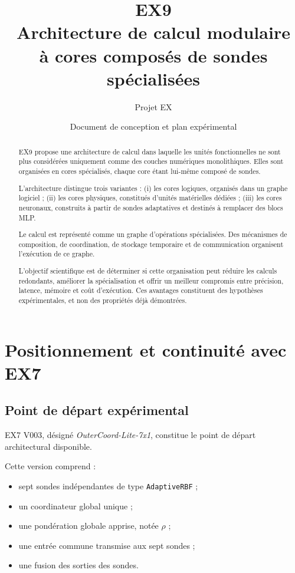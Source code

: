 \documentclass[11pt,a4paper]{article}
\title{
  \textbf{EX9}\\[0.3cm]
  \Large Architecture de calcul modulaire\\
  \Large à cores composés de sondes spécialisées
}
\author{Projet EX}
\date{Document de conception et plan expérimental}
\begin{document}
\maketitle

\begin{abstract}
EX9 propose une architecture de calcul dans laquelle les unités
fonctionnelles ne sont plus considérées uniquement comme des couches
numériques monolithiques. Elles sont organisées en cores spécialisés,
chaque core étant lui-même composé de sondes.

L'architecture distingue trois variantes :
(i) les cores logiques, organisés dans un graphe logiciel ;
(ii) les cores physiques, constitués d'unités matérielles dédiées ;
(iii) les cores neuronaux, construits à partir de sondes adaptatives
et destinés à remplacer des blocs MLP.

Le calcul est représenté comme un graphe d'opérations spécialisées.
Des mécanismes de composition, de coordination, de stockage temporaire
et de communication organisent l'exécution de ce graphe.

L'objectif scientifique est de déterminer si cette organisation peut
réduire les calculs redondants, améliorer la spécialisation et offrir
un meilleur compromis entre précision, latence, mémoire et coût
d'exécution. Ces avantages constituent des hypothèses expérimentales,
et non des propriétés déjà démontrées.
\end{abstract}

\tableofcontents
\newpage

\section{Positionnement et continuité avec EX7}

\subsection{Point de départ expérimental}

EX7 V003, désigné \textit{OuterCoord-Lite-7x1}, constitue le point
de départ architectural disponible.

Cette version comprend :
\begin{itemize}
  \item sept sondes indépendantes de type \texttt{AdaptiveRBF} ;
  \item un coordinateur global unique ;
  \item une pondération globale apprise, notée $\rho$ ;
  \item une entrée commune transmise aux sept sondes ;
  \item une fusion des sorties des sondes.
\end{itemize}
\end{document}
